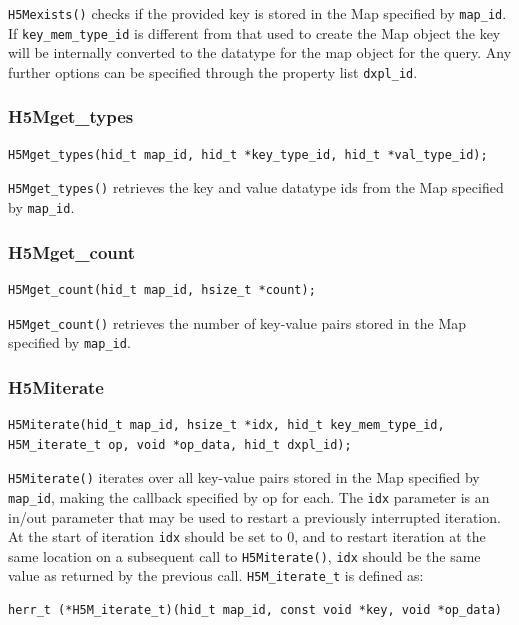 \verb+H5Mexists()+ checks if the provided key is stored in the Map specified by \verb+map_id+. If \verb+key_mem_type_id+ is different from that used to create the Map object the key will be internally converted to the datatype for the map object for the query. Any further options can be specified through the property list \verb+dxpl_id+.

\subsubsection{H5Mget\_types}

{
\begin{lstlisting}
H5Mget_types(hid_t map_id, hid_t *key_type_id, hid_t *val_type_id);
\end{lstlisting}
}

\verb+H5Mget_types()+ retrieves the key and value datatype ids from the Map specified by \verb+map_id+.

\subsubsection{H5Mget\_count}

{
\begin{lstlisting}
H5Mget_count(hid_t map_id, hsize_t *count);
\end{lstlisting}
}

\verb+H5Mget_count()+ retrieves the number of key-value pairs stored in the Map specified by \verb+map_id+.

\subsubsection{H5Miterate}

{
\begin{lstlisting}
H5Miterate(hid_t map_id, hsize_t *idx, hid_t key_mem_type_id, H5M_iterate_t op, void *op_data, hid_t dxpl_id);
\end{lstlisting}
}

\verb+H5Miterate()+ iterates over all key-value pairs stored in the Map specified by \verb+map_id+, making the callback specified by op for each. The \verb+idx+ parameter is an in/out parameter that may be used to restart a previously interrupted iteration. At the start of iteration \verb+idx+ should be set to 0, and to restart iteration at the same location on a subsequent call to \verb+H5Miterate()+, \verb+idx+ should be the same value as returned by the previous call.
\verb+H5M_iterate_t+ is defined as:
{
\begin{lstlisting}
herr_t (*H5M_iterate_t)(hid_t map_id, const void *key, void *op_data)
\end{lstlisting}
}

